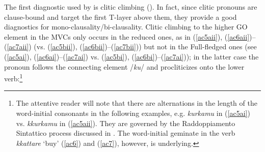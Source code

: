 \documentclass[output=paper]{langscibook}
\begin{document}
The first diagnostic used by \citet{cardinaletti2003a} is clitic climbing (\citealt{rizzi1976a}). In fact, since clitic pronouns are clause-bound and target the first T-layer above them, they provide a good diagnostics for mono-clausality/bi-clausality. Clitic climbing to the higher GO element in the MVCs only occurs in the reduced ones, as in (\ref{ac5aii}), (\ref{ac6aii})--(\ref{ac7aii}) (vs. (\ref{ac5bii}), (\ref{ac6bii})--(\ref{ac7bii})) but not in the Full-fledged ones (see (\ref{ac5ai}), (\ref{ac6ai})--(\ref{ac7ai}) vs. (\ref{ac5bi}), (\ref{ac6bi})--(\ref{ac7ai})); in the latter case the pronoun follows the connecting element /\textit{ku}/ and procliticizes onto the lower verb:\footnote{The attentive reader will note that there are alternations in the length of the word-initial consonants in the following examples, e.g. \textit{kurkamu} in (\ref{ac5ai}) vs. \textit{kkurkamu} in (\ref{ac5aii}).  They are governed by the Raddoppiamento Sintattico process discussed in .  The word-initial geminate in the verb \textit{kkattare} ‘buy’ (\ref{ac6}) and (\ref{ac7}), however, is underlying.}
\end{document}
